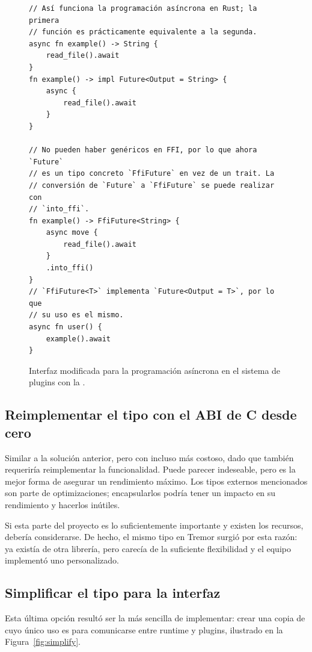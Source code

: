 \begin{figure}
    \centering
    \begin{verbatim}
// Así funciona la programación asíncrona en Rust; la primera
// función es prácticamente equivalente a la segunda.
async fn example() -> String {
    read_file().await
}
fn example() -> impl Future<Output = String> {
    async {
        read_file().await
    }
}

// No pueden haber genéricos en FFI, por lo que ahora `Future`
// es un tipo concreto `FfiFuture` en vez de un trait. La
// conversión de `Future` a `FfiFuture` se puede realizar con
// `into_ffi`.
fn example() -> FfiFuture<String> {
    async move {
        read_file().await
    }
    .into_ffi()
}
// `FfiFuture<T>` implementa `Future<Output = T>`, por lo que
// su uso es el mismo.
async fn user() {
    example().await
}
    \end{verbatim}
    \caption{Interfaz modificada para la programación asíncrona en el sistema de
    plugins con la \crate {}.}%
    \label{fig:async_ffi}
\end{figure}

\subsection{Reimplementar el tipo con el ABI de C desde cero}

Similar a la solución anterior, pero con incluso más costoso, dado que también
requeriría reimplementar la funcionalidad. Puede parecer indeseable, pero es la
mejor forma de asegurar un rendimiento máximo. Los tipos externos mencionados
son parte de optimizaciones; encapsularlos podría tener un impacto en su
rendimiento y hacerlos inútiles.

Si esta parte del proyecto es lo suficientemente importante y existen los
recursos, debería considerarse. De hecho, el mismo tipo  en Tremor
surgió por esta razón: ya existía  de otra librería, pero
carecía de la suficiente flexibilidad y el equipo implementó uno personalizado.

\subsection{Simplificar el tipo para la interfaz}

Esta última opción resultó ser la más sencilla de implementar: crear una copia
de  cuyo único uso es para comunicarse entre runtime y plugins,
ilustrado en la Figura~\ref{fig:simplify}.

